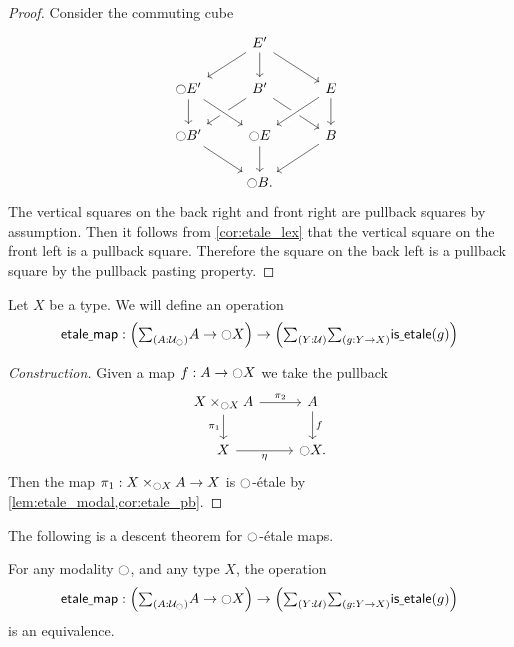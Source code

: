 \begin{proof}
Consider the commuting cube
\begin{equation*}
\begin{tikzcd}
& E' \arrow[dr] \arrow[d] \arrow[dl] \\
\modal E' \arrow[d] & B' \arrow[dl] \arrow[dr] & E \arrow[dl,crossing over] \arrow[d] \\
\modal B' \arrow[dr] & \modal E \arrow[d] \arrow[from=ul,crossing over] & B \arrow[dl] \\
& \modal B. & \phantom{\modal E'}
\end{tikzcd}
\end{equation*}
The vertical squares on the back right and front right are pullback squares by assumption.
Then it follows from \cref{cor:etale_lex} that the vertical square on the front left is a pullback square.
Therefore the square on the back left is a pullback square by the pullback pasting property.
\end{proof}

\begin{defn}
Let $X$ be a type. We will define an operation
\begin{equation*}
\etmap:\Big(\sm{A:\UU_\modal}A\to\modal X\Big)\to\Big(\sm{Y:\UU}{g:Y\to X}\isetale(g)\Big)
\end{equation*}
\end{defn}

\begin{proof}[Construction]
Given a map $f:A\to {\ensuremath{\ocircle}} X$ we take the pullback
\begin{equation*}
\begin{tikzcd}
X\times_{\modal X}A \arrow[d,swap,"\pi_1"] \arrow[r,"\pi_2"] & A \arrow[d,"f"] \\
X \arrow[r,swap,"\modalunit"] & \modal X.
\end{tikzcd}
\end{equation*}
Then the map $\pi_1:X\times_{{\ocircle} X}A\to X$ is ${\ocircle}$-\'etale by \cref{lem:etale_modal,cor:etale_pb}.
\end{proof}

The following is a descent theorem for ${\ocircle}$-\'etale maps.

\begin{thm}\label{thm:modal_descent}
For any modality ${\ocircle}$, and any type $X$, the operation
\begin{equation*}
\etmap:\Big(\sm{A:\UU_\modal}A\to\modal X\Big)\to\Big(\sm{Y:\UU}{g:Y\to X}\isetale(g)\Big)
\end{equation*}
is an equivalence.
\end{thm}

